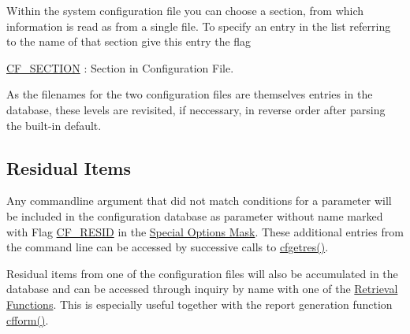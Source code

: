 Within the system configuration file you can choose a section, from which information is read as from a single file. To specify an entry in the list referring to the name of that section give this entry the flag


\begin{DoxyItemize}
\item \hyperlink{group__special__options__mask_ga603f0467f101b71f5f869381429ffef4}{C\-F\-\_\-\-S\-E\-C\-T\-I\-O\-N} \-: Section in Configuration File. 
\end{DoxyItemize}

As the filenames for the two configuration files are themselves entries in the database, these levels are revisited, if neccessary, in reverse order after parsing the built-\/in default.\hypertarget{config_levels_residuals}{}\subsection{Residual Items}\label{config_levels_residuals}
Any commandline argument that did not match conditions for a parameter will be included in the configuration database as parameter without name marked with Flag \hyperlink{group__special__options__mask_ga5415b257c706aae33d91d3947a3429c0}{C\-F\-\_\-\-R\-E\-S\-I\-D} in the \hyperlink{group__special__options__mask}{Special Options Mask}. These additional entries from the command line can be accessed by successive calls to \hyperlink{group__retrieval_ga6ef6076e946383ab198ee26b9aa5603a}{cfgetres()}.

Residual items from one of the configuration files will also be accumulated in the database and can be accessed through inquiry by name with one of the \hyperlink{index_retrieval_functions}{Retrieval Functions}. This is especially useful together with the report generation function \hyperlink{group__report__generation_ga2695585ee0a7485da6075848fa27a33f}{cfform()}. 